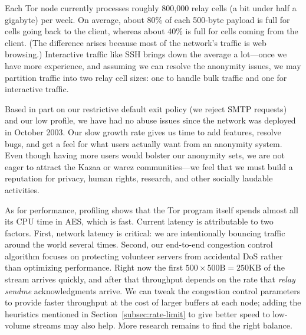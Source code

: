\documentclass[times,10pt,twocolumn]{article}
\begin{document}
Each Tor node currently processes roughly 800,000 relay
cells (a bit under half a gigabyte) per week. On average, about 80\%
of each 500-byte payload is full for cells going back to the client,
whereas about 40\% is full for cells coming from the client. (The difference
arises because most of the network's traffic is web browsing.) Interactive
traffic like SSH brings down the average a lot---once we have more
experience, and assuming we can resolve the anonymity issues, we may
partition traffic into two relay cell sizes: one to handle
bulk traffic and one for interactive traffic.

Based in part on our restrictive default exit policy (we
reject SMTP requests) and our low profile, we have had no abuse
issues since the network was deployed in October
2003. Our slow growth rate gives us time to add features,
resolve bugs, and get a feel for what users actually want from an
anonymity system.  Even though having more users would bolster our
anonymity sets, we are not eager to attract the Kazaa or warez
communities---we feel that we must build a reputation for privacy, human
rights, research, and other socially laudable activities.

As for performance, profiling shows that the Tor program itself spends almost
all its CPU time in AES, which is fast.  Current latency is attributable
to two factors. First, network latency is critical: we are
intentionally bouncing traffic around the world several times. Second,
our end-to-end congestion control algorithm focuses on protecting
volunteer servers from accidental DoS rather than optimizing
performance. Right now the first $500 \times 500\mbox{B}=250\mbox{KB}$
of the stream arrives
quickly, and after that throughput depends on the rate that \emph{relay
sendme} acknowledgments arrive. We can tweak the congestion control
parameters to provide faster throughput at the cost of
larger buffers at each node; adding the heuristics mentioned in
Section~\ref{subsec:rate-limit} to give better speed to low-volume
streams may also help. More research remains to find the
right balance.
\end{document}
